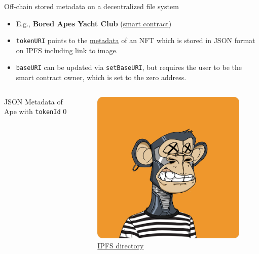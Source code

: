 \documentclass[handout]{beamer}
\begin{document}
\begin{frame}{Off-chain stored metadata on a decentralized file system}

	\begin{itemize}
		\item E.g., \textbf{Bored Apes Yacht Club} (\href{https://etherscan.io/address/0xbc4ca0eda7647a8ab7c2061c2e118a18a936f13d}{\link smart contract})
		\item \texttt{tokenURI} points to the \href{ipfs://QmeSjSinHpPnmXmspMjwiXyN6zS4E9zccariGR3jxcaWtq/1}{\link metadata}  of an NFT which is stored in JSON format on IPFS including link to image.
		\item \texttt{baseURI} can be updated via \texttt{setBaseURI}, but requires the user to be the smart contract owner, which is set to the zero address.
	\end{itemize} 
	\begin{columns}
		\begin{column}{0.67\textwidth}
		\vspace{-1em}
			\begin{samplecode}{JSON Metadata of Ape with \texttt{tokenId} 0}
				
			\end{samplecode}		
		\end{column}
		\begin{column}{0.35\textwidth}
			\begin{figure}
				\vspace{-1em}
				\centering
				\includegraphics[scale=0.18]{../assets/images/ape_0.png}
				\caption*{\link \href{https://bafybeibnzhc7vp4hnfcocw7s2jej2tj5xqpwseyz3ifylismh47cr45rhm.ipfs.dweb.link/}{IPFS directory}}	
			\end{figure}
		\end{column}
	\end{columns}
\end{frame}
\end{document}
